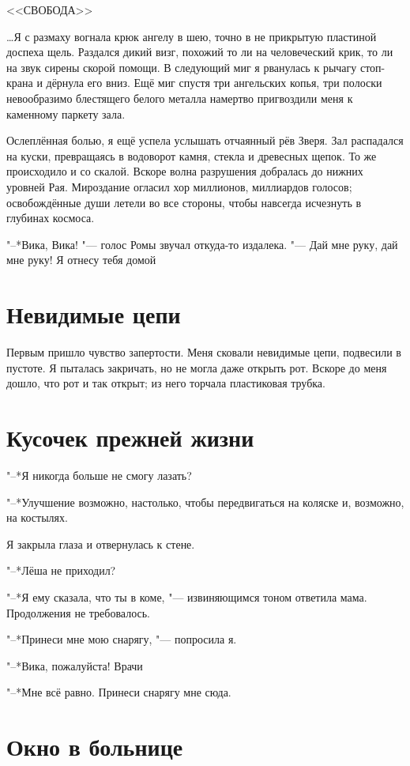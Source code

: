 <<СВОБОДА>>

\dots Я с размаху вогнала крюк ангелу в шею, точно в не прикрытую пластиной доспеха щель.
Раздался дикий визг, похожий то ли на человеческий крик, то ли на звук сирены скорой помощи.
В следующий миг я рванулась к рычагу стоп-крана и дёрнула его вниз.
Ещё миг спустя три ангельских копья, три полоски невообразимо блестящего белого металла намертво пригвоздили меня к каменному паркету зала.

Ослеплённая болью, я ещё успела услышать отчаянный рёв Зверя.
Зал распадался на куски, превращаясь в водоворот камня, стекла и древесных щепок.
То же происходило и со скалой.
Вскоре волна разрушения добралась до нижних уровней Рая.
Мироздание огласил хор миллионов, миллиардов голосов;
освобождённые души летели во все стороны, чтобы навсегда исчезнуть в глубинах космоса.

"--*Вика, Вика! "--- голос Ромы звучал откуда-то издалека.
"--- Дай мне руку, дай мне руку! 
Я отнесу тебя домой\ldotst

\section{Невидимые цепи}

Первым пришло чувство запертости.
Меня сковали невидимые цепи, подвесили в пустоте.
Я пыталась закричать, но не могла даже открыть рот.
Вскоре до меня дошло, что рот и так открыт;
из него торчала пластиковая трубка.

\section{Кусочек прежней жизни}

"--*Я никогда больше не смогу лазать?

"--*Улучшение возможно, настолько, чтобы передвигаться на коляске и, возможно, на костылях.

Я закрыла глаза и отвернулась к стене.

"--*Лёша не приходил?

"--*Я ему сказала, что ты в коме, "--- извиняющимся тоном ответила мама.
Продолжения не требовалось.

"--*Принеси мне мою снарягу, "--- попросила я.

"--*Вика, пожалуйста!
Врачи\ldotst

"--*Мне всё равно.
Принеси снарягу мне сюда.

\section{Окно в больнице}

